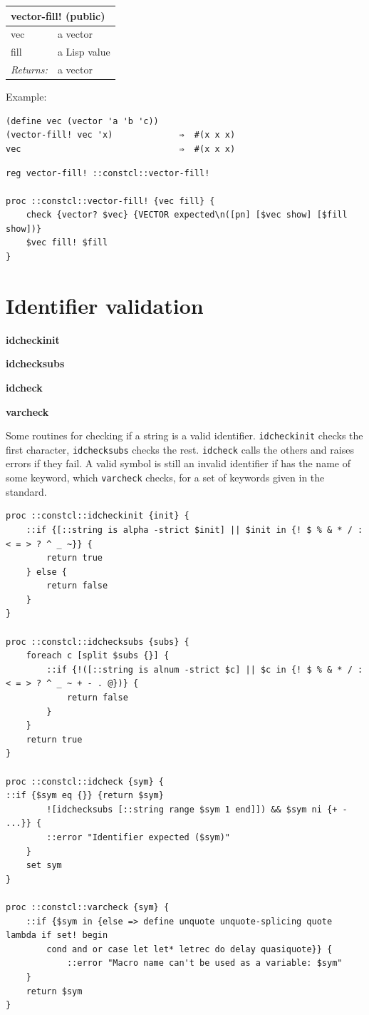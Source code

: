 \documentclass[twoside,9pt]{report}
\begin{document}
\begin{tabular}{ |l l| }
\hline
\multicolumn{2}{|l|}{vector-fill! (public)} \\
\hline
vec & a vector \\
fill & a Lisp value \\
\textit{Returns:} & a vector \\
\hline
\end{tabular}


Example:

\noindent\makebox[\linewidth]{\rule{\linewidth}{0.4pt}}
\begin{lstlisting}
(define vec (vector 'a 'b 'c))
(vector-fill! vec 'x)             ⇒  #(x x x)
vec                               ⇒  #(x x x)
\end{lstlisting}
\noindent\makebox[\linewidth]{\rule{\linewidth}{0.4pt}}
\noindent\makebox[\linewidth]{\rule{\linewidth}{0.4pt}}
\begin{lstlisting}
reg vector-fill! ::constcl::vector-fill!
 
proc ::constcl::vector-fill! {vec fill} {
    check {vector? $vec} {VECTOR expected\n([pn] [$vec show] [$fill show])}
    $vec fill! $fill
}
\end{lstlisting}
\noindent\makebox[\linewidth]{\rule{\linewidth}{0.4pt}}
\section{Identifier validation}
\label{identifier-validation}

\textbf{idcheckinit}


\textbf{idchecksubs}


\textbf{idcheck}


\textbf{varcheck}


Some routines for checking if a string is a valid identifier. \texttt{idcheckinit} checks the first character, \texttt{idchecksubs} checks the rest. \texttt{idcheck} calls the others and raises errors if they fail. A valid symbol is still an invalid identifier if has the name of some keyword, which \texttt{varcheck} checks, for a set of keywords given in the standard.

\noindent\makebox[\linewidth]{\rule{\linewidth}{0.4pt}}
\begin{lstlisting}
proc ::constcl::idcheckinit {init} {
    ::if {[::string is alpha -strict $init] || $init in {! $ % & * / : < = > ? ^ _ ~}} {
        return true
    } else {
        return false
    }
}
 
proc ::constcl::idchecksubs {subs} {
    foreach c [split $subs {}] {
        ::if {!([::string is alnum -strict $c] || $c in {! $ % & * / : < = > ? ^ _ ~ + - . @})} {
            return false
        }
    }
    return true
}
 
proc ::constcl::idcheck {sym} {
::if {$sym eq {}} {return $sym}
        ![idchecksubs [::string range $sym 1 end]]) && $sym ni {+ - ...}} {
        ::error "Identifier expected ($sym)"
    }
    set sym
}
 
proc ::constcl::varcheck {sym} {
    ::if {$sym in {else => define unquote unquote-splicing quote lambda if set! begin
        cond and or case let let* letrec do delay quasiquote}} {
            ::error "Macro name can't be used as a variable: $sym"
    }
    return $sym
}
\end{lstlisting}
\noindent\makebox[\linewidth]{\rule{\linewidth}{0.4pt}}
\end{document}
